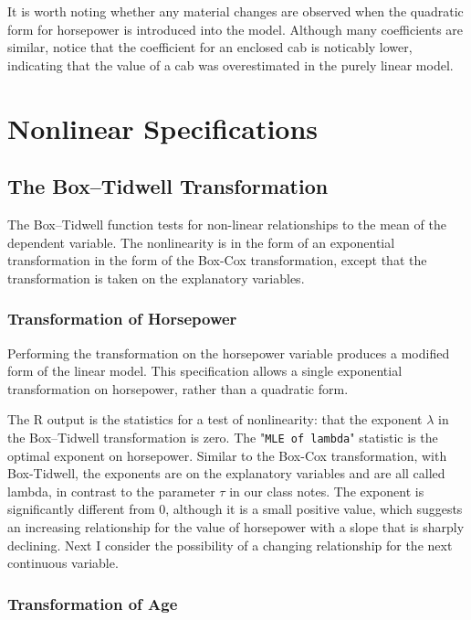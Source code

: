 \documentclass[11pt]{paper}
\begin{document}
It is worth noting whether any material changes are observed when the quadratic form for horsepower
is introduced into the model.
Although many coefficients are similar, notice that 
the coefficient for an enclosed cab is noticably lower, 
indicating that the value of a cab was overestimated in the purely linear model. 


\section{Nonlinear Specifications}


\subsection{The Box--Tidwell Transformation}

The Box--Tidwell function tests for non-linear relationships
to the mean of the dependent variable.
The nonlinearity is in the form of an
exponential transformation in the form of the Box-Cox
transformation, except that the transformation is taken
on the explanatory variables.


\subsubsection{Transformation of Horsepower}


Performing the transformation on the horsepower variable
produces a modified form of the linear model.
This specification allows a single exponential
transformation on horsepower, rather than a quadratic form.



The \textsf{R} output is the statistics for a test of nonlinearity:
that the exponent $\lambda$ in the Box--Tidwell transformation is zero.
%
The "\texttt{MLE of lambda}" statistic is the optimal exponent on horsepower.
Similar to the Box-Cox transformation,
with Box-Tidwell, the exponents are on the explanatory variables
and are all called lambda, in contrast
to the parameter $\tau$ in our class notes.
The exponent is significantly different from 0,
although it is a small positive value,
which suggests an increasing relationship
for the value of horsepower
with a slope that is sharply declining.
Next I consider the possibility of a changing relationship 
for the next continuous variable. 


\subsubsection{Transformation of Age}
\end{document}
